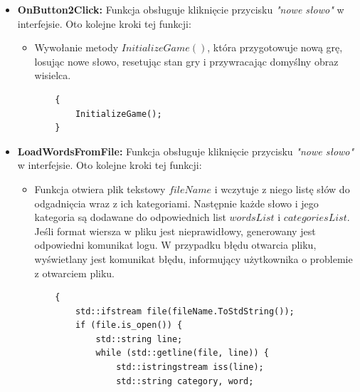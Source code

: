 \documentclass[]{report}
\begin{document}
\begin{itemize}
\begin{itemize}
\begin{lstlisting}
	}
			\end{lstlisting}
		\end{itemize}
		\item \textbf{OnButton2Click:} Funkcja obsługuje kliknięcie przycisku \textit{"nowe słowo"} w interfejsie. Oto kolejne kroki tej funkcji:
		\begin{itemize}
			\item Wywołanie metody $InitializeGame()$, która przygotowuje nową grę, losując nowe słowo, resetując stan gry i przywracając domyślny obraz wisielca. 
			\begin{lstlisting}
	{
		InitializeGame();			
	}
			\end{lstlisting}
		\end{itemize}
			\item \textbf{LoadWordsFromFile:} Funkcja obsługuje kliknięcie przycisku \textit{"nowe słowo"} w interfejsie. Oto kolejne kroki tej funkcji:
			\begin{itemize}
			\item Funkcja otwiera plik tekstowy $fileName$ i wczytuje z niego listę słów do odgadnięcia wraz z ich kategoriami. Następnie każde słowo i jego kategoria są dodawane do odpowiednich list $wordsList$ i $categoriesList$. Jeśli format wiersza w pliku jest nieprawidłowy, generowany jest odpowiedni komunikat logu. W przypadku błędu otwarcia pliku, wyświetlany jest komunikat błędu, informujący użytkownika o problemie z otwarciem pliku.
			\begin{lstlisting}
	{
		std::ifstream file(fileName.ToStdString());
		if (file.is_open()) {
			std::string line;
			while (std::getline(file, line)) {
				std::istringstream iss(line);
				std::string category, word;
				

\end{lstlisting}
\end{itemize}
\end{itemize}
\end{document}
